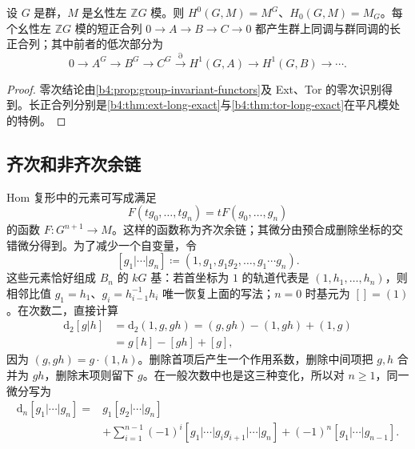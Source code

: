 \begin{proposition}\label{b4:prop:group-homology-degree-zero}
	设 \(G\) 是群，\(M\) 是幺性左 \(\mathbb ZG\) 模。则 \(H^0(G,M)=M^G\)、\(H_0(G,M)=M_G\)。每个幺性左 \(\mathbb ZG\) 模的短正合列 \(0\to A\to B\to C\to0\) 都产生群上同调与群同调的长正合列；其中前者的低次部分为
	\[
		0\longrightarrow A^G\longrightarrow B^G\longrightarrow C^G \xrightarrow{\partial}H^1(G,A)\longrightarrow H^1(G,B)\longrightarrow\cdots.
	\]
\end{proposition}
\begin{proof}
	零次结论由\cref{b4:prop:group-invariant-functors}及 Ext、Tor 的零次识别得到。长正合列分别是\cref{b4:thm:ext-long-exact}与\cref{b4:thm:tor-long-exact}在平凡模处的特例。
\end{proof}

\subsection{齐次和非齐次余链}
\label{b4:subsec:1101:03}

Hom 复形中的元素可写成满足
\[
	F(tg_0,\ldots,tg_n)=tF(g_0,\ldots,g_n)
\]
的函数 \(F:G^{n+1}\to M\)。这样的函数称为齐次余链；其微分由预合成删除坐标的交错微分得到。为了减少一个自变量，令
\[
	[g_1|\cdots|g_n]\coloneqq(1,g_1,g_1g_2,\ldots,g_1\cdots g_n).
\]
这些元素恰好组成 \(B_n\) 的 \(kG\) 基：若首坐标为 \(1\) 的轨道代表是 \((1,h_1,\ldots,h_n)\)，则相邻比值 \(g_1=h_1\)、\(g_i=h_{i-1}^{-1}h_i\) 唯一恢复上面的写法；\(n=0\) 时基元为 \([]=(1)\)。在次数二，直接计算
\[
	\begin{aligned}
		\mathrm{d}_2[g|h] &=\mathrm{d}_2(1,g,gh)=(g,gh)-(1,gh)+(1,g)\\
		&=g[h]-[gh]+[g],
	\end{aligned}
\]
因为 \((g,gh)=g\cdot(1,h)\)。删除首项后产生一个作用系数，删除中间项把 \(g,h\) 合并为 \(gh\)，删除末项则留下 \(g\)。在一般次数中也是这三种变化，所以对 \(n\ge1\)，同一微分写为
\[
	\begin{split}
		\mathrm{d}_n[g_1|\cdots|g_n] ={}&g_1[g_2|\cdots|g_n]\\
		&+\sum_{i=1}^{n-1}(-1)^i[g_1|\cdots|g_i g_{i+1}|\cdots|g_n] +(-1)^n[g_1|\cdots|g_{n-1}].
	\end{split}
\]

